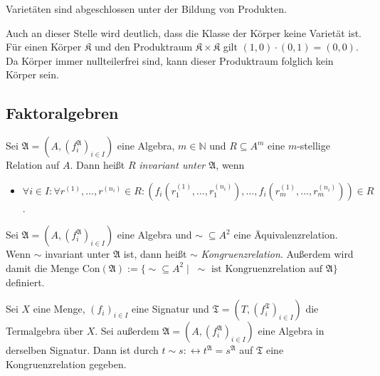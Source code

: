\begin{corollary}\label{corollary:prod-varietaeten}
    Varietäten sind abgeschlossen unter der Bildung von Produkten.
\end{corollary}

\begin{remark}
    Auch an dieser Stelle wird deutlich, dass die Klasse der Körper keine Varietät ist. Für einen Körper $\mathfrak{K}$
    und den Produktraum $\mathfrak{K}\times \mathfrak{K}$ gilt $(1,0)\cdot (0,1)=(0,0)$. Da Körper immer nullteilerfrei sind,
    kann dieser Produktraum folglich kein Körper sein.
\end{remark}


\subsection{Faktoralgebren}

\begin{definition}
    Sei $\mathfrak{A}=(A,(f^\mathfrak{A}_i)_{i\in I})$ eine Algebra, $m\in\mathbb{N}$ und $R\subseteq A^m$ eine $m$-stellige
    Relation auf $A$. Dann heißt $R$ \emph{invariant unter $\mathfrak{A}$}, wenn
    \begin{itemize}
        \item $\forall i\in I:\forall r^{(1)},\ldots,r^{(n_i)}\in R:(f_i(r_1^{(1)},\ldots,r_1^{(n_i)}),\ldots,f_i(r_m^{(1)},\ldots,r_m^{(n_i)}))\in R$.
    \end{itemize}
\end{definition}

\begin{definition}
    Sei $\mathfrak{A}=(A,(f^\mathfrak{A}_i)_{i\in I})$ eine Algebra und $\sim\;\subseteq A^2$ eine Äquivalenzrelation.
    Wenn $\sim$ invariant unter $\mathfrak{A}$ ist, dann heißt $\sim$ \emph{Kongruenzrelation}. Außerdem wird damit die Menge
    Con$(\mathfrak{A}):=\{\sim\subseteq A^2\mid \;\sim \text{ ist Kongruenzrelation auf }\mathfrak{A}\}$ definiert.
\end{definition}

\begin{example}
    Sei $X$ eine Menge, $(f_i)_{i\in I}$ eine Signatur und $\mathfrak{T}=(T,(f^\mathfrak{T}_i)_{i\in I})$ die Termalgebra über $X$.
    Sei außerdem $\mathfrak{A}=(A,(f^\mathfrak{A}_i)_{i\in I})$ eine Algebra in derselben Signatur. Dann ist durch
    $t\sim s:\leftrightarrow t^\mathfrak{A}=s^\mathfrak{A}$ auf $\mathfrak{T}$ eine Kongruenzrelation gegeben.
\end{example}


